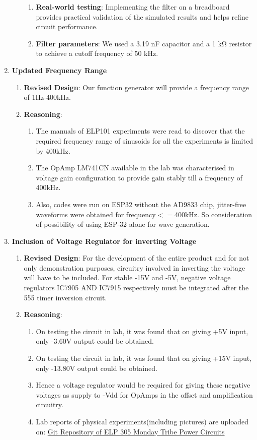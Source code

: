 \documentclass[12pt,a4paper]{article}
\begin{document}
\begin{enumerate}
\begin{enumerate}
\begin{enumerate}
\item \textbf{Real-world testing}: Implementing the filter on a breadboard provides practical validation of the simulated results and helps refine circuit performance.
\item \textbf{Filter parameters}: We used a 3.19 nF capacitor and a 1 kΩ resistor to achieve a cutoff frequency of 50 kHz.
\end{enumerate}
\end{enumerate}
\item \textbf{Updated Frequency Range}
\begin{enumerate}
    \item \textbf{Revised Design}: Our function generator will provide a frequency range of 1Hz-400kHz.
    \item \textbf{Reasoning}: 
    \begin{enumerate}
        \item The manuals of ELP101 experiments were read to discover that the required frequency range of sinusoids for all the experiments is limited by 400kHz.
        \item The OpAmp LM741CN available in the lab was characterised in voltage gain configuration to provide gain stably till a frequency of 400kHz.
        \item Also, codes were run on ESP32 without the AD9833 chip, jitter-free waveforms were obtained for frequency$<=$400kHz. So consideration of possibility of using ESP-32 alone for wave generation.
    \end{enumerate}
\end{enumerate} 
\item \textbf{Inclusion of Voltage Regulator for inverting Voltage}
\begin{enumerate}
    \item \textbf{Revised Design}: For the development of the entire product and for not only demonstration purposes, circuitry involved in inverting the voltage will have to be included. For stable -15V and -5V, negative voltage regulators IC7905 AND IC7915 respectively must be integrated after the 555 timer inversion circuit.
    \item \textbf{Reasoning}:
    \begin{enumerate}
        \item On testing the circuit in lab, it was found that on giving +5V input, only -3.60V output could be obtained.
        \item  On testing the circuit in lab, it was found that on giving +15V input, only -13.80V output could be obtained.
        \item Hence a voltage regulator would be required for giving these negative voltages as supply to -Vdd for OpAmps in the offset and amplification circuitry.
        \item Lab reports of physical experiments(including pictures) are uploaded on: \href{https://github.com/lisha-goel/elp305_power}{Git Repository of ELP 305 Monday Tribe Power Circuits}
    \end{enumerate}
\end{enumerate}
\end{enumerate}
\end{document}
